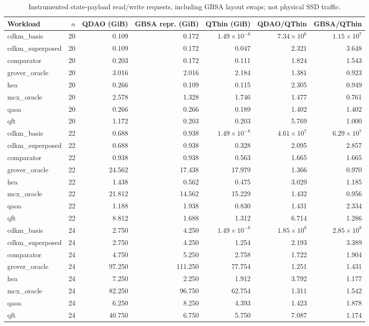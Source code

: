 \begin{table}[t]
\centering
\small
\caption{Instrumented state-payload read/write requests, including GBSA layout swaps; not physical SSD traffic.}
\label{tab:three-way-traffic}
\begin{tabular}{lrrrrrr}
\hline
Workload & $n$ & QDAO (GiB) & GBSA repr. (GiB) & QThin (GiB) & QDAO/QThin & GBSA/QThin \\
\hline
cdkm\_basis & 20 & 0.109 & 0.172 & $1.49\times 10^{-8}$ & $7.34\times 10^{6}$ & $1.15\times 10^{7}$ \\
cdkm\_superposed & 20 & 0.109 & 0.172 & 0.047 & 2.321 & 3.648 \\
comparator & 20 & 0.203 & 0.172 & 0.111 & 1.824 & 1.543 \\
grover\_oracle & 20 & 3.016 & 2.016 & 2.184 & 1.381 & 0.923 \\
hea & 20 & 0.266 & 0.109 & 0.115 & 2.305 & 0.949 \\
mcx\_oracle & 20 & 2.578 & 1.328 & 1.746 & 1.477 & 0.761 \\
qaoa & 20 & 0.266 & 0.266 & 0.189 & 1.402 & 1.402 \\
qft & 20 & 1.172 & 0.203 & 0.203 & 5.769 & 1.000 \\
cdkm\_basis & 22 & 0.688 & 0.938 & $1.49\times 10^{-8}$ & $4.61\times 10^{7}$ & $6.29\times 10^{7}$ \\
cdkm\_superposed & 22 & 0.688 & 0.938 & 0.328 & 2.095 & 2.857 \\
comparator & 22 & 0.938 & 0.938 & 0.563 & 1.665 & 1.665 \\
grover\_oracle & 22 & 24.562 & 17.438 & 17.979 & 1.366 & 0.970 \\
hea & 22 & 1.438 & 0.562 & 0.475 & 3.029 & 1.185 \\
mcx\_oracle & 22 & 21.812 & 14.562 & 15.229 & 1.432 & 0.956 \\
qaoa & 22 & 1.188 & 1.938 & 0.830 & 1.431 & 2.334 \\
qft & 22 & 8.812 & 1.688 & 1.312 & 6.714 & 1.286 \\
cdkm\_basis & 24 & 2.750 & 4.250 & $1.49\times 10^{-8}$ & $1.85\times 10^{8}$ & $2.85\times 10^{8}$ \\
cdkm\_superposed & 24 & 2.750 & 4.250 & 1.254 & 2.193 & 3.389 \\
comparator & 24 & 4.750 & 5.250 & 2.758 & 1.722 & 1.904 \\
grover\_oracle & 24 & 97.250 & 111.250 & 77.754 & 1.251 & 1.431 \\
hea & 24 & 7.250 & 2.250 & 1.912 & 3.792 & 1.177 \\
mcx\_oracle & 24 & 82.250 & 96.750 & 62.754 & 1.311 & 1.542 \\
qaoa & 24 & 6.250 & 8.250 & 4.393 & 1.423 & 1.878 \\
qft & 24 & 40.750 & 6.750 & 5.750 & 7.087 & 1.174 \\
\hline
\end{tabular}
\end{table}

